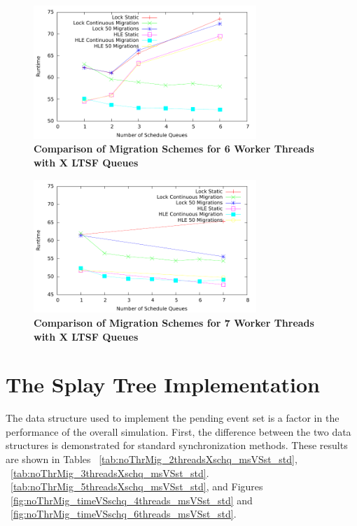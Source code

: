 \documentclass[11pt]{book}
\begin{document}
\begin{figure}[H]
    \centering
    \graphicspath{ {./figures/} }
    \includegraphics[width=0.75\textwidth,keepaspectratio]{migComp_6threads}
    \caption{\textbf{Comparison of Migration Schemes for 6 Worker Threads with X
    LTSF Queues}}
    \label{fig:migComp_6threads}
\end{figure}

\begin{figure}[H]
    \centering
    \graphicspath{ {./figures/} }
    \includegraphics[width=0.75\textwidth,keepaspectratio]{migComp_7threads}
    \caption{\textbf{Comparison of Migration Schemes for 7 Worker Threads with X
    LTSF Queues}}
    \label{fig:migComp_7threads}
\end{figure}

\section{The Splay Tree Implementation}

The data structure used to implement the pending event set is a factor in the
performance of the overall simulation.  First, the difference between the two
data structures is demonstrated for standard synchronization methods.  These
results are shown in Tables ~\ref{tab:noThrMig_2threadsXschq_msVSst_std},
~\ref{tab:noThrMig_3threadsXschq_msVSst_std}.
~\ref{tab:noThrMig_5threadsXschq_msVSst_std}, and Figures
~\ref{fig:noThrMig_timeVSschq_4threads_msVSst_std} and
~\ref{fig:noThrMig_timeVSschq_6threads_msVSst_std}.
\end{document}
